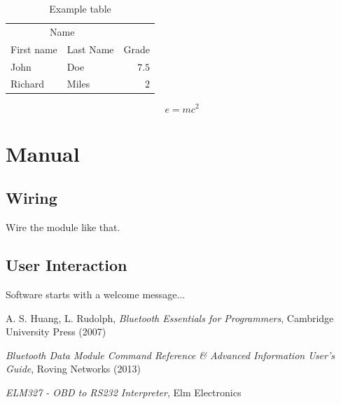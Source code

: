 \documentclass[twoside]{article}
\begin{document}
\begin{multicols}{2}
\begin{table}[H]
\caption{Example table}
\centering
\begin{tabular}{llr}
\toprule
\multicolumn{2}{c}{Name} \\
\cmidrule(r){1-2}
First name & Last Name & Grade \\
\midrule
John & Doe & $7.5$ \\
Richard & Miles & $2$ \\
\bottomrule
\end{tabular}
\end{table}

\lipsum[5] %

\begin{equation}
\label{eq:emc}
e = mc^2
\end{equation}

\lipsum[6] %


\section{Manual}

\subsection{Wiring}

Wire the module like that.

\subsection{User Interaction}

Software starts with a welcome message...



\begin{thebibliography}{99} %

\bibitem{} A. S. Huang, L. Rudolph,
  \emph{Bluetooth Essentials for Programmers},
  Cambridge University Press (2007)

\bibitem{}
  \emph{Bluetooth Data Module Command Reference \& Advanced Information User's Guide},
  Roving Networks (2013)
  
\bibitem{}
  \emph{ELM327 - OBD to RS232 Interpreter},
  Elm Electronics
 
\end{thebibliography}


\end{multicols}
\end{document}
